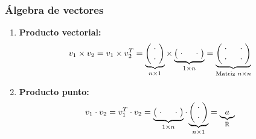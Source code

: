 \subsubsection{Álgebra de vectores}

\begin{enumerate}
    \item \textbf{Producto vectorial:} \begin{align*}
        v_1 \times v_2 = v_1 \times v_2^T &= \underbrace{\begin{pmatrix} \hspace*{0.1cm}\cdot\hspace*{0.1cm} \\ \hspace*{0.1cm}\cdot\hspace*{0.1cm} \end{pmatrix}}_{n\times1} \times \underbrace{\begin{pmatrix} \hspace*{0.1cm}\cdot\hspace*{0.1cm} & \hspace*{0.1cm}\cdot\hspace*{0.1cm} \end{pmatrix}}_{1\times n} = \underbrace{\begin{pmatrix} \hspace*{0.1cm}\cdot\hspace*{0.1cm} & \hspace*{0.1cm}\cdot\hspace*{0.1cm} \\ \hspace*{0.1cm}\cdot\hspace*{0.1cm} & \hspace*{0.1cm}\cdot\hspace*{0.1cm} \end{pmatrix}}_{\text{Matriz } n\times n}
    \end{align*}
    \item \textbf{Producto punto:} \begin{align*}
        v_1 \cdot v_2 &= v_1^T \cdot v_2 = \underbrace{\begin{pmatrix} \hspace*{0.1cm}\cdot\hspace*{0.1cm} & \hspace*{0.1cm}\cdot\hspace*{0.1cm} \end{pmatrix}}_{1\times n} \cdot \underbrace{\begin{pmatrix} \hspace*{0.1cm}\cdot\hspace*{0.1cm} \\ \hspace*{0.1cm}\cdot\hspace*{0.1cm} \end{pmatrix}}_{n\times1} = \underbrace{a}_{\mathbb{R}}

\end{align*}
\end{enumerate}
